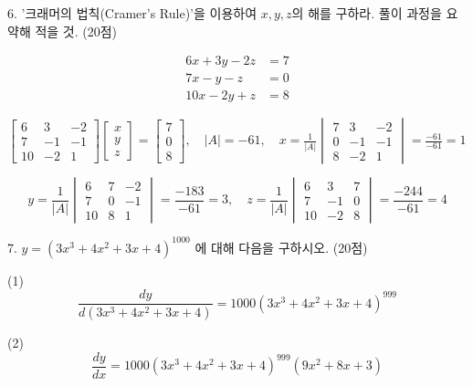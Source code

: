 \documentclass[aspectratio=169]{beamer}
\begin{document}
\begin{frame}
  6. '크래머의 법칙(Cramer's Rule)'을 이용하여 \( x, y, z \)의 해를 구하라. 풀이 과정을 요약해 적을 것. (20점)

  \[
  \begin{aligned}
  6x + 3y - 2z &= 7 \\
  7x - y - z &= 0 \\
  10x - 2y + z &= 8
  \end{aligned}
  \]

  $
  \begin{bmatrix}
    6  &  3  & -2 \\
    7  & -1  & -1 \\
   10  & -2 &  1 
  \end{bmatrix}
  \begin{bmatrix}
    x \\
    y \\
    z 
  \end{bmatrix}
  =
  \begin{bmatrix}
    7 \\
    0 \\
    8 
  \end{bmatrix}
  , \quad 
  |A| = -61
  , \quad 
  x = \frac{1}{|A|} \begin{vmatrix}
    7  &  3  & -2 \\
    0  & -1  & -1 \\
    8  & -2 &  1 
  \end{vmatrix} = \frac{-61}{-61} = 1 
  $

  \[ y = \frac{1}{|A|} \begin{vmatrix}
     6 & 7  & -2 \\
     7 & 0  & -1 \\
    10 & 8  &  1 
  \end{vmatrix} = \frac{-183}{-61} = 3 
  , \quad 
  z = \frac{1}{|A|} \begin{vmatrix}
     6 &  3  & 7  \\
     7 & -1  & 0  \\
    10 & -2  &  8 
  \end{vmatrix} = \frac{-244}{-61} = 4 
  \]


\end{frame}



\begin{frame}
  7. \( y = (3x^3 + 4x^2 + 3x + 4)^{1000} \) 에 대해 다음을 구하시오. (20점)


    (1)
    \[
    \frac{dy}{d(3x^3 + 4x^2 + 3x + 4)} = 1000(3x^3 + 4x^2 + 3x + 4)^{999}
    \]

    (2)
    \[
    \frac{dy}{dx} = 1000(3x^3 + 4x^2 + 3x + 4)^{999} (9x^2 + 8x + 3)
    \]
\end{frame}
\end{document}
